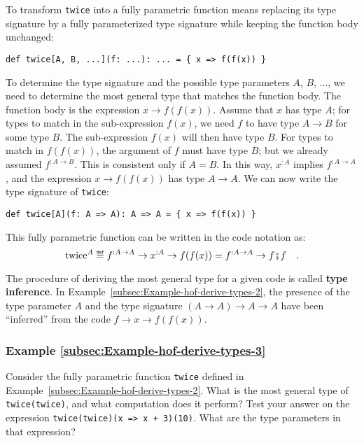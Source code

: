 To transform \lstinline!twice! into a fully parametric function means
replacing its type signature by a fully parameterized type signature
while keeping the function body unchanged:
\begin{lstlisting}
def twice[A, B, ...](f: ...): ... = { x => f(f(x)) }
\end{lstlisting}

To determine the type signature and the possible type parameters $A$,
$B$, ..., we need to determine the most general type that matches
the function body. The function body is the expression $x\rightarrow f(f(x))$.
Assume that $x$ has type $A$; for types to match in the sub-expression
$f(x)$, we need $f$ to have type $A\rightarrow B$ for some type
$B$. The sub-expression $f(x)$ will then have type $B$. For types
to match in $f(f(x))$, the argument of $f$ must have type $B$;
but we already assumed $f^{:A\rightarrow B}$. This is consistent
only if $A=B$. In this way, $x^{:A}$ implies $f^{:A\rightarrow A}$,
and the expression $x\rightarrow f(f(x))$ has type $A\rightarrow A$.
We can now write the type signature of \lstinline!twice!:
\begin{lstlisting}
def twice[A](f: A => A): A => A = { x => f(f(x)) }
\end{lstlisting}
This fully parametric function can be written in the code notation
as:
\begin{equation}
\text{twice}^{A}\triangleq f^{:A\rightarrow A}\rightarrow x^{:A}\rightarrow f(f(x))=f^{:A\rightarrow A}\rightarrow f\bef f\quad.\label{eq:hof-def-of-twice-in-math-notation}
\end{equation}

The procedure of deriving the most general type for a given code is
called \textbf{type inference}. In Example~\ref{subsec:Example-hof-derive-types-2},
the presence of the type parameter $A$ and the type signature $\left(A\rightarrow A\right)\rightarrow A\rightarrow A$
have been \textsf{``}inferred\textsf{''} from the code $f\rightarrow x\rightarrow f(f(x))$.

\subsubsection{Example \label{subsec:Example-hof-derive-types-3}\ref{subsec:Example-hof-derive-types-3}}

Consider the fully parametric function \lstinline!twice! defined
in Example~\ref{subsec:Example-hof-derive-types-2}. What is the
most general type of \lstinline!twice(twice)!, and what computation
does it perform? Test your answer on the expression \lstinline!twice(twice)(x => x + 3)(10)!.
What are the type parameters in that expression?

